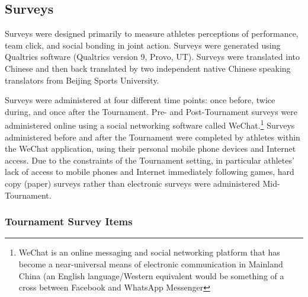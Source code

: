 \begin{CJK}{UTF8}{gbsn}


\subsection{Surveys}
Surveys were designed primarily to measure athletes perceptions of performance, team click, and social bonding in joint action.  Surveys were generated using Qualtrics software (Qualtrics version 9, Provo, UT). Surveys were translated into Chinese and then back translated by two independent native Chinese speaking translators from Beijing Sports University.

Surveys were administered at four different time points: once before, twice during, and once after the Tournament.  Pre- and Post-Tournament surveys were administered online using a social networking software called WeChat.\footnote{WeChat is an online messaging and social networking platform that has become a near-universal means of electronic communication in Mainland China (an English language/Western equivalent would be something of a cross between Facebook and WhatsApp Messenger} Surveys administered before and after the Tournament were completed by athletes within the WeChat application, using their personal mobile phone devices and Internet access.  Due to the constraints of the Tournament setting, in particular athletes’ lack of access to mobile phones and Internet immediately following games, hard copy (paper) surveys rather than electronic surveys were administered Mid-Tournament.





\subsubsection{Tournament Survey Items\label{survey:Tournament Survey Items}}


\end{CJK}
